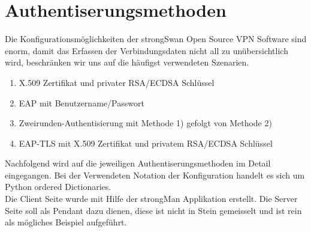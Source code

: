\section{Authentiserungsmethoden}
Die Konfigurationsmöglichkeiten der strongSwan Open Source VPN Software sind enorm, damit das Erfassen der Verbindungsdaten nicht all zu unübersichtlich wird, beschränken wir uns auf die häufigst verwendeten Szenarien.

\begin{enumerate}
	\item X.509 Zertifikat und privater RSA/ECDSA Schlüssel
	\item EAP mit Benutzername/Passwort
	\item Zweirunden-Authentisierung mit Methode 1) gefolgt von Methode 2)
	\item EAP-TLS mit X.509 Zertifikat und privatem RSA/ECDSA Schlüssel
\end{enumerate}

Nachfolgend wird auf die jeweiligen Authentiserungsmethoden im Detail eingegangen. Bei der Verwendeten Notation der Konfiguration handelt es sich um Python ordered Dictionaries.\\
Die Client Seite wurde mit Hilfe der strongMan Applikation erstellt. Die Server Seite soll als Pendant dazu dienen, diese ist nicht in Stein gemeisselt und ist rein als mögliches Beispiel aufgeführt.

